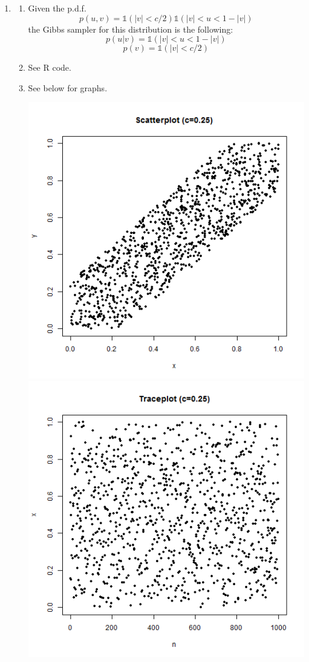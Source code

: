 \documentclass{article}
\begin{document}
\begin{enumerate}
\item

\begin{enumerate}
\item Given the p.d.f.
$$ p(u,v) = \mathds{1}(|v|<c/2)\mathds{1}(|v|<u<1-|v|) $$
the Gibbs sampler for this distribution is the following:
$$ p(u|v) = \mathds{1}(|v|<u<1-|v|) $$
$$ p(v) = \mathds{1}(|v|<c/2) $$

\item See R code.

\item See below for graphs.

\includegraphics[scale=0.4]{scat_025x.png}
\includegraphics[scale=0.4]{trace_025x.png} \\


\end{enumerate}
\end{enumerate}
\end{document}
